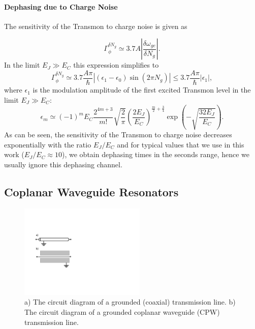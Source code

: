 \paragraph{Dephasing due to Charge Noise}

The sensitivity of the Transmon to charge noise is given as

%
\begin{equation}
\Gamma_\phi^{\delta N_g} \simeq 3.7A \left|\frac{\delta \omega_{ge}}{\delta N_g}\right|.
\end{equation}
%
In the limit $E_J\gg E_C$ this expression simplifies to
%
\begin{equation}
\Gamma_\phi^{\delta N_g} \simeq 3.7\frac{A\pi}{\hbar}\left| (\epsilon_1-\epsilon_0)\sin{\left(2\pi N_g\right)}\right| \leq 3.7\frac{A\pi}{\hbar}|\epsilon_1|,
\end{equation}
%
where $\epsilon_1$ is the modulation amplitude of the first excited Transmon level \citep{koch_charge-insensitive_2007} in the limit $E_J\gg E_C$:
%
\begin{equation}
\epsilon_m\simeq (-1)^m E_C\frac{2^{4m+3}}{m!}\sqrt{\frac{2}{\pi}}\left(\frac{2E_J}{E_C}\right)^{\frac{m}{2}+\frac{3}{4}}\exp{\left(-\sqrt{\frac{32E_J}{E_C}}\right)}.
\end{equation}
%
As can be seen, the sensitivity of the Transmon to charge noise decreases exponentially with the ratio $E_J/E_C$ and for typical values that we use in this work ($E_J/E_C\approx 10$), we obtain dephasing times in the seconds range, hence we usually ignore this dephasing channel. 

\subsection{Coplanar Waveguide Resonators}

\begin{figure}
	\includegraphics[width=6cm]{"./material/figures/introduction/transmission_lines"}
	\caption{a) The circuit diagram of a grounded (coaxial) transmission line. b) The circuit diagram of a grounded coplanar waveguide (CPW) transmission line.}
	\label{fig:tline_schematic}
\end{figure}

